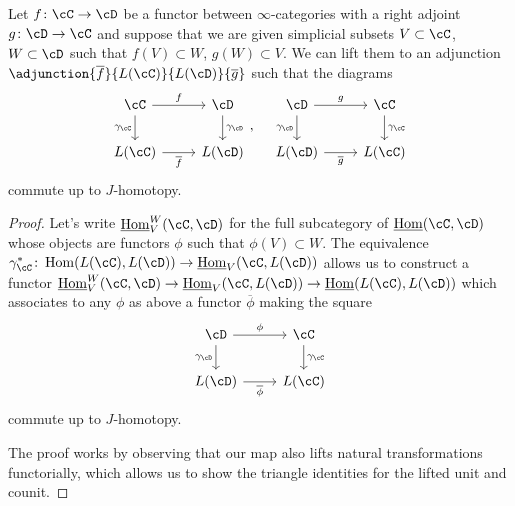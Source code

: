 \begin{prop}\label{7114}

  Let $f\colon\cC\rightarrow\cD$ be a functor between $\infty$-categories with
  a right adjoint $g\colon\cD\rightarrow\cC$ and suppose that we are given
  simplicial subsets $V\subset\cC$, $W\subset\cD$ such that $f(V)\subset W$,
  $g(W)\subset V$. We can lift them to an adjunction
  $\adjunction{\overline{f}}{L(\cC)}{L(\cD)}{\overline{g}}$ such that the
  diagrams
  \[\begin{tikzcd}
    \cC & \cD \\
    {L(\cC)} & {L(\cD)}
    \arrow["{\gamma_\cD}", from=1-2, to=2-2]
    \arrow["{\gamma_\cC}"', from=1-1, to=2-1]
    \arrow["{\overline{f}}"', from=2-1, to=2-2]
    \arrow["f", from=1-1, to=1-2]
  \end{tikzcd},
  \quad
  \begin{tikzcd}
    \cD & \cC \\
    {L(\cD)} & {L(\cC)}
    \arrow["{\gamma_\cC}", from=1-2, to=2-2]
    \arrow["{\gamma_\cD}"', from=1-1, to=2-1]
    \arrow["{\overline{g}}"', from=2-1, to=2-2]
    \arrow["g", from=1-1, to=1-2]
  \end{tikzcd}
  \]
  commute up to $J$-homotopy.
\end{prop}
\begin{proof}
  Let's write $\home_V^W(\cC,\cD)$ for the full subcategory of $\home(\cC,\cD)$
  whose objects are functors $\phi$ such that $\phi(V)\subset W$. The
  equivalence
  $\gamma^*_\cC\colon\Hom(L(\cC),L(\cD))\rightarrow\home_V(\cC,L(\cD))$ allows
  us to construct a functor
  $\home^W_V(\cC,\cD)\rightarrow\home_V(\cC,L(\cD))\rightarrow\home(L(\cC),L(\cD))$
  which associates to any $\phi$ as above a functor $\overline{\phi}$ making the
  square
  \[\begin{tikzcd}
    \cD & \cC \\
    {L(\cD)} & {L(\cC)}
    \arrow["{\gamma_\cC}", from=1-2, to=2-2]
    \arrow["{\gamma_\cD}"', from=1-1, to=2-1]
    \arrow["{\overline{\phi}}"', from=2-1, to=2-2]
    \arrow["\phi", from=1-1, to=1-2]
  \end{tikzcd}\]
  commute up to $J$-homotopy.

  \noindent
  The proof works by observing that our map also lifts natural transformations
  functorially, which allows us to show the triangle identities for the lifted
  unit and counit.
\end{proof}

